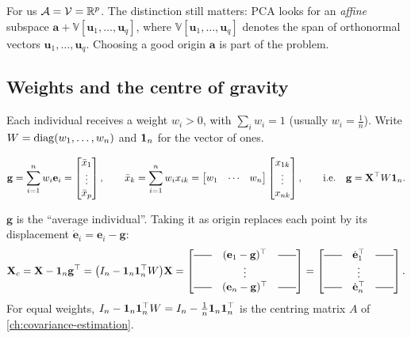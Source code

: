 \begin{notechapter}
For us $\mathcal A = \mathcal V = \mathbb{R}^p$. The distinction still matters: PCA looks for an
\emph{affine} subspace $\mathbf a + \mathbb V[\mathbf u_1,\dots,\mathbf u_q]$, where
$\mathbb V[\mathbf u_1,\dots,\mathbf u_q]$ denotes the span of orthonormal vectors
$\mathbf u_1,\dots,\mathbf u_q$. Choosing a good origin $\mathbf a$ is part of the problem.

\subsection{Weights and the centre of gravity}

Each individual receives a weight $w_i>0$, with $\sum_iw_i = 1$ (usually $w_i = \frac1n$).
Write $W = \operatorname{diag}(w_1,\dots,w_n)$ and $\mathbf{1}_n$ for the vector of ones.

\begin{definition}
\[
  \mathbf g = \sum_{i=1}^nw_i\mathbf e_i = \begin{bmatrix}\bar x_1\\ \vdots\\ \bar x_p\end{bmatrix},
  \qquad \bar x_k = \sum_{i=1}^nw_ix_{ik} = \begin{bmatrix}w_1 & \cdots & w_n\end{bmatrix}
  \begin{bmatrix}x_{1k}\\ \vdots\\ x_{nk}\end{bmatrix},
  \qquad\text{i.e.}\quad \mathbf g = \mathbf X^\top W\mathbf{1}_n .
\]
\end{definition}

$\mathbf g$ is the ``average individual''. Taking it as origin replaces each point by its
displacement $\dot{\mathbf e}_i = \mathbf e_i - \mathbf g$:
\[
  \mathbf X_c = \mathbf X - \bbone_n\mathbf g^\top = \bigl(I_n - \bbone_n\bbone_n^\top W\bigr)\mathbf X
  =
  \begin{bmatrix}
    \horzbar & (\mathbf e_1 - \mathbf g)^\top & \horzbar\\
     & \vdots & \\
    \horzbar & (\mathbf e_n - \mathbf g)^\top & \horzbar
  \end{bmatrix}
  =
  \begin{bmatrix}
    \horzbar & \dot{\mathbf e}_1^\top & \horzbar\\
     & \vdots & \\
    \horzbar & \dot{\mathbf e}_n^\top & \horzbar
  \end{bmatrix}.
\]
For equal weights, $I_n - \mathbf{1}_n\mathbf{1}_n^\top W = I_n - \frac1n\mathbf{1}_n\mathbf{1}_n^\top$ is the
centring matrix $A$ of \cref{ch:covariance-estimation}.


\end{notechapter}
